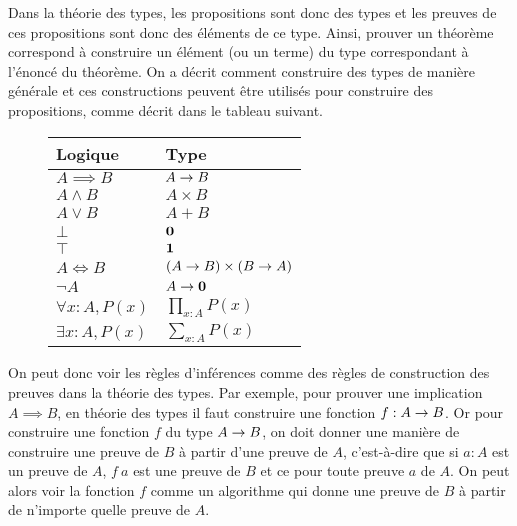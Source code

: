 \documentclass[../../rapport.tex]{subfiles}
\begin{document}
  Dans la théorie des types, les propositions sont donc des types et les preuves de ces propositions sont donc des éléments de ce type.
  Ainsi, prouver un théorème correspond à construire un élément (ou un terme) du type correspondant à l'énoncé du théorème.
  On a décrit comment construire des types de manière générale et ces constructions peuvent être utilisés pour construire des propositions,
  comme décrit dans le tableau suivant.

  \begin{figure}[ht]
    \centering
    \begin{tabular}{m{3cm} l}
      Logique & Type \vspace{0.4em} \\
      \hline
      \vspace{0.6em}
      $A \implies B$ & $A \rightarrow B$ \\
      $A \wedge B$ & $A \times B$ \\
      $A \vee B$ & $A + B$ \\
      $\bot$ & $\operatorname{\textbf{0}}$ \\
      $\top$ & $\operatorname{\textbf{1}}$ \\
      $A \iff B$ & $(A \rightarrow B) \times (B \rightarrow A)$ \\
      $\neg A$ & $A \rightarrow \operatorname{\textbf{0}}$ \vspace{0.2em}\\
      \hline \vspace{0.5em}
      $\forall x : A, P(x)$ & $\prod_{x:A}P(x)$ \\
      $\exists x : A, P(x)$ & $\sum_{x:A}P(x)$ \\
    \end{tabular}
  \end{figure}

  On peut donc voir les règles d'inférences comme des règles de construction des preuves dans la théorie des types.
  Par exemple, pour prouver une implication $A \implies B$, en théorie des types il faut construire une fonction $f : A \rightarrow B$.
  Or pour construire une fonction $f$ du type $A \rightarrow B$,
  on doit donner une manière de construire une preuve de $B$ à partir d'une preuve de $A$,
  c'est-à-dire que si $a : A$ est un preuve de $A$, $f\ a$ est une preuve de $B$ et ce pour toute preuve $a$ de $A$.
  On peut alors voir la fonction $f$ comme un algorithme qui donne une preuve de $B$ à partir de n'importe quelle preuve de $A$.
\end{document}
